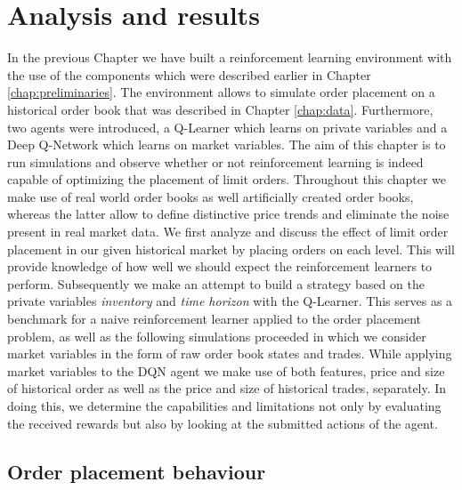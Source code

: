 \chapter{Analysis and results}
\label{chap:analysis}

In the previous Chapter we have built a reinforcement learning environment with the use of the components which were described earlier in Chapter \ref{chap:preliminaries}.
The environment allows to simulate order placement on a historical order book that was described in Chapter \ref{chap:data}.
Furthermore, two agents were introduced, a Q-Learner which learns on private variables and a Deep Q-Network which learns on market variables.
The aim of this chapter is to run simulations and observe whether or not reinforcement learning is indeed capable of optimizing the placement of limit orders.
Throughout this chapter we make use of real world order books as well artificially created order books, whereas the latter allow to define distinctive price trends and eliminate the noise present in real market data.
We first analyze and discuss the effect of limit order placement in our given historical market by placing orders on each level.
This will provide knowledge of how well we should expect the reinforcement learners to perform.
Subsequently we make an attempt to build a strategy based on the private variables \textit{inventory} and \textit{time horizon} with the Q-Learner.
This serves as a benchmark for a naive reinforcement learner applied to the order placement problem, as well as the following simulations proceeded in which we consider market variables in the form of raw order book states and trades.
While applying market variables to the DQN agent we make use of both features, price and size of historical order as well as the price and size of historical trades, separately.
In doing this, we determine the capabilities and limitations not only by evaluating the received rewards but also by looking at the submitted actions of the agent.

\section{Order placement behaviour}

